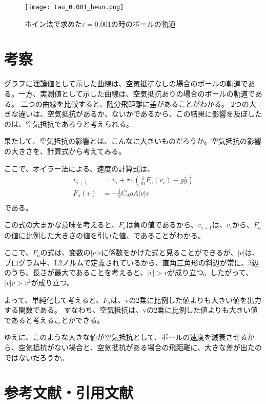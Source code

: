 \documentclass[a4paper, 11pt, titlepage]{jsarticle}
\begin{document}
\begin{figure}[H]
	\centering
	\texttt{[image: tau\_0.001\_heun.png]}
	\caption{ホイン法で求めた$\tau = 0.001$の時のボールの軌道}
	\label{fig:tau_0.001_heun}
\end{figure}

\section{考察}
グラフに理論値として示した曲線は、空気抵抗なしの場合のボールの軌道である。一方、実測値として示した曲線は、空気抵抗ありの場合のボールの軌道である。
二つの曲線を比較すると、随分飛距離に差があることがわかる。
2つの大きな違いは、空気抵抗があるか、ないかであるから、この結果に影響を及ぼしたのは、空気抵抗であろうと考えられる。

果たして、空気抵抗の影響とは、こんなに大きいものだろうか。空気抵抗の影響の大きさを、計算式から考えてみる。

ここで、オイラー法による、速度の計算式は、
\begin{align*}
	v_{i+1} &= v_{i} + \tau \cdot (\frac{1}{m} F_a(v_{i}) - g\hat{y})\\
	F_a(v) &= -\frac{1}{2}C_d\rho A|v|v\\
\end{align*}
である。

この式の大まかな意味を考えると、$F_a$は負の値であるから、$v_{i+1}$は、$v_i$から、$F_a$の値に比例した大きさの値を引いた値、であることがわかる。

ここで、$F_a$の式は、変数の$|v|v$に係数をかけた式と見ることができるが、$|v|$は、プログラム中、L2ノルムで定義されているから、直角三角形の斜辺が常に、3辺のうち、長さが最大であることを考えると、$|v| > v$が成り立つ。したがって、$|v|v > v^2$が成り立つ。

よって、単純化して考えると、$F_a$は、vの2乗に比例した値よりも大きい値を出力する関数である。
すなわち、空気抵抗は、vの2乗に比例した値よりも大きい値であると考えることができる。

ゆえに、このような大きな値が空気抵抗として、ボールの速度を減衰させるから、空気抵抗がない場合と、空気抵抗がある場合の飛距離に、大きな差が出たのではないだろうか。

\section*{参考文献・引用文献}

\end{document}
